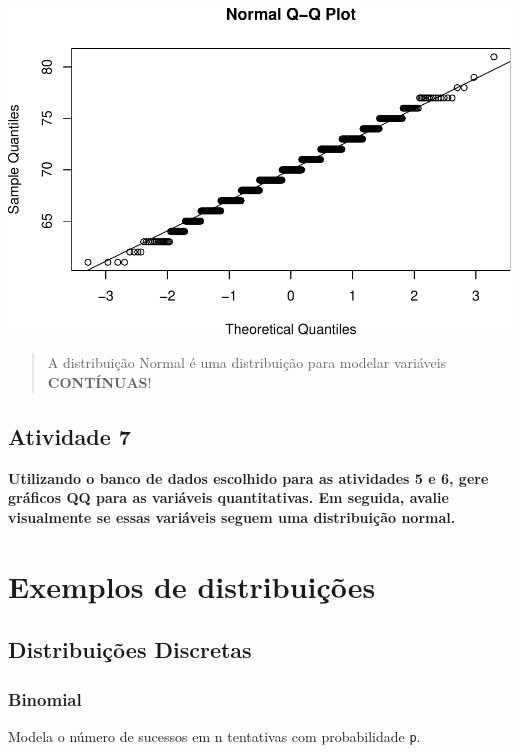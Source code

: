 \documentclass[
]{book}
\begin{document}
\includegraphics{Livro-Estatistica+R_files/figure-latex/unnamed-chunk-33-2.pdf}

\begin{quote}
A distribuição Normal é uma distribuição para modelar variáveis \textbf{CONTÍNUAS}!
\end{quote}

\section{Atividade 7}\label{atividade-7}

\textbf{Utilizando o banco de dados escolhido para as atividades 5 e 6, gere gráficos QQ para as variáveis quantitativas. Em seguida, avalie visualmente se essas variáveis seguem uma distribuição normal.}

\chapter{Exemplos de distribuições}\label{exemplos-de-distribuiuxe7uxf5es}

\section{Distribuições Discretas}\label{distribuiuxe7uxf5es-discretas}

\subsection{Binomial}\label{binomial}

Modela o número de sucessos em n tentativas com probabilidade \texttt{p}.
\end{document}
